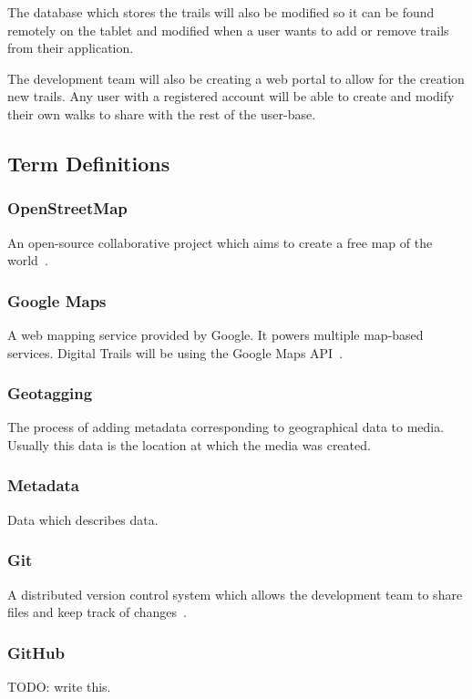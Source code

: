 \documentclass[11pt,a4paper]{article}
\begin{document}
The database which stores the trails will also be modified so it can be found remotely on the tablet and modified when a user wants to add or remove trails from their application.

The development team will also be creating a web portal to allow for the creation new trails. Any user with a registered account will be able to create and modify their own walks to share with the rest of the user-base.

\subsection{Term Definitions}
\label{sec:terms}

\subsubsection{OpenStreetMap}
An open-source collaborative project which aims to create a free map of the world~\cite{OSM}.

\subsubsection{Google Maps}
A web mapping service provided by Google. It powers multiple map-based services. Digital Trails will be using the Google Maps API~\cite{googleAPI}.

\subsubsection{Geotagging}
The process of adding metadata corresponding to geographical data to media. Usually this data is the location at which the media was created.

\subsubsection{Metadata}
Data which describes data.

\subsubsection{Git}
A distributed version control system which allows the development team to share files and keep track of changes~\cite{git}.

\subsubsection{GitHub}
TODO: write this.
\end{document}
